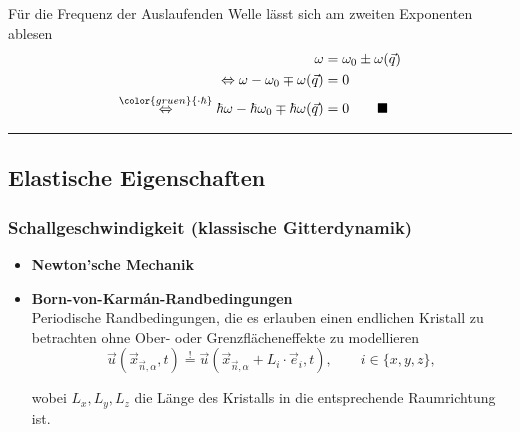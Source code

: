 \documentclass{article}
\newcommand{\comment}[1]{{\color{gruen}{#1}}}
\begin{document}
{	Für die Frequenz der Auslaufenden Welle lässt sich am zweiten Exponenten ablesen
		\begin{align*}
			\omega &= \omega_0 \pm \omega(\vec{q}) \\
			\Leftrightarrow \omega - \omega_0 \mp \omega(\vec{q}) &= 0 \\
			\stackrel{ \comment{\cdot \hbar} }{\Leftrightarrow} \hbar \omega - \hbar \omega_0 \mp \hbar \omega(\vec{q}) &= 0 \qquad \blacksquare
		\end{align*}				
\hrule
}



\newpage


\subsection{Elastische Eigenschaften}
\subsubsection{Schallgeschwindigkeit (klassische Gitterdynamik)}
	\begin{itemize}
		\item \textbf{Newton'sche Mechanik}


		\item \textbf{Born-von-Karmán-Randbedingungen}\\
		Periodische Randbedingungen, die es erlauben einen endlichen Kristall zu betrachten ohne Ober- oder Grenzflächeneffekte zu modellieren
			\begin{equation}
				\vec{u}(\vec{x}_{\vec{n},\alpha},t) \stackrel{!}{=} \vec{u}(\vec{x}_{\vec{n},\alpha} + L_i \cdot \vec{e}_i, t), \qquad i \in \{x,y,z\},
			\end{equation}
		
		wobei $L_x, L_y, L_z$ die Länge des Kristalls in die entsprechende Raumrichtung ist.
	\end{itemize}
	
\end{document}
